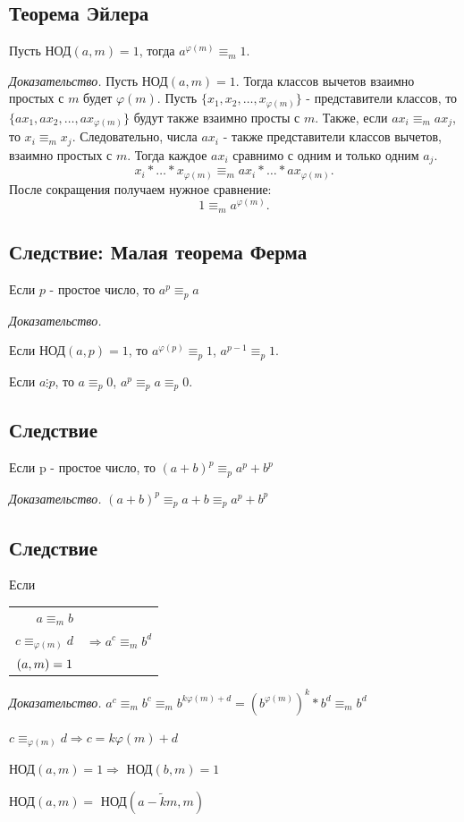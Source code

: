 \documentclass[12pt]{article}
\let\gcd\relax
\DeclareMathOperator{\gcd}{НОД}
\begin{document}
\subsection{Теорема Эйлера}
Пусть НОД$(a,m)=1$, тогда $a^{\varphi(m)}\equiv_{m}1.$
\par \textit{Доказательство.} Пусть НОД$(a,m)=1.$ Тогда классов вычетов взаимно простых с $m$ будет $\varphi(m)$. Пусть $\{x_{1},x_{2},\dots,x_{\varphi(m)}\}$ - представители классов, то $\{ax_{1},ax_{2},\dots,ax_{\varphi(m)}\}$ будут также взаимно просты с $m$. Также, если $ax_{i}\equiv_{m} ax_{j}$, то $x_{i}\equiv_{m} x_{j}.$ Следовательно, числа $ax_{i}$ - также представители классов вычетов, взаимно простых с $m$. Тогда каждое $ax_{i}$ сравнимо с одним и только одним $a_{j}$. \[x_{i}*\dots*x_{\varphi(m)}\equiv_{m} ax_{i}*\dots*ax_{\varphi(m)}.\] После сокращения получаем нужное сравнение: \[1\equiv_{m} a^{\varphi(m)}.\]

\subsection{Следствие: Малая теорема Ферма}
Если $p$ - простое число, то $a^{p}\equiv_{p}a$
\par \textit{Доказательство.}
\par Если НОД$(a,p)=1$, то $a^{\varphi(p)}\equiv_{p}1$, $a^{p-1}\equiv_{p}1$.
\par Если $a\vdots p$, то $a\equiv_{p}0$, $a^{p}\equiv_{p}a\equiv_{p}0$.

\subsection{Следствие}
Если p - простое число, то $(a+b)^{p}\equiv_{p}a^{p}+b^{p}$
\par \textit{Доказательство.} $(a+b)^{p}\equiv_{p}a+b\equiv_{p}a^{p}+b^{p}$

\subsection{Следствие}
Если \begin{tabular}{r|c}
    $a\equiv_{m}b$                                               \\
    $c\equiv_{\varphi(m)}d$ & $\Rightarrow a^{c}\equiv_{m}b^{d}$ \\
    $\gcd(a,m)=1$
\end{tabular} \par
\textit{Доказательство.} $a^{c}\equiv_{m}b^{c}\equiv_{m}b^{k\varphi(m)+d}=(b^{\varphi(m)})^{k}*b^{d}\equiv_{m}b^{d}$
\par $c\equiv_{\varphi(m)}d \Rightarrow c=k\varphi(m)+d$
\par НОД$(a,m)=1 \Rightarrow$ НОД$(b,m)=1$
\par НОД$(a,m)=$ НОД$(a-\widetilde{k}m,m)$
\end{document}

